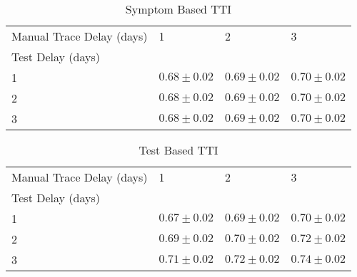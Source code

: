 \documentclass{article}
\begin{document}
    \begin{table}[H]
         \begin{tabular}{llll}
\toprule
Manual Trace Delay (days) &                1 &                2 &                3 \\
Test Delay (days) &                  &                  &                  \\
\midrule
1                 &  $0.68 \pm 0.02$ &  $0.69 \pm 0.02$ &  $0.70 \pm 0.02$ \\
2                 &  $0.68 \pm 0.02$ &  $0.69 \pm 0.02$ &  $0.70 \pm 0.02$ \\
3                 &  $0.68 \pm 0.02$ &  $0.69 \pm 0.02$ &  $0.70 \pm 0.02$ \\
\bottomrule
\end{tabular}

        \caption{Symptom Based TTI}
    \end{table}
    


    \begin{table}[H]
         \begin{tabular}{llll}
\toprule
Manual Trace Delay (days) &                1 &                2 &                3 \\
Test Delay (days) &                  &                  &                  \\
\midrule
1                 &  $0.67 \pm 0.02$ &  $0.69 \pm 0.02$ &  $0.70 \pm 0.02$ \\
2                 &  $0.69 \pm 0.02$ &  $0.70 \pm 0.02$ &  $0.72 \pm 0.02$ \\
3                 &  $0.71 \pm 0.02$ &  $0.72 \pm 0.02$ &  $0.74 \pm 0.02$ \\
\bottomrule
\end{tabular}

        \caption{Test Based TTI}
    \end{table}
    

\clearpage
\end{document}
